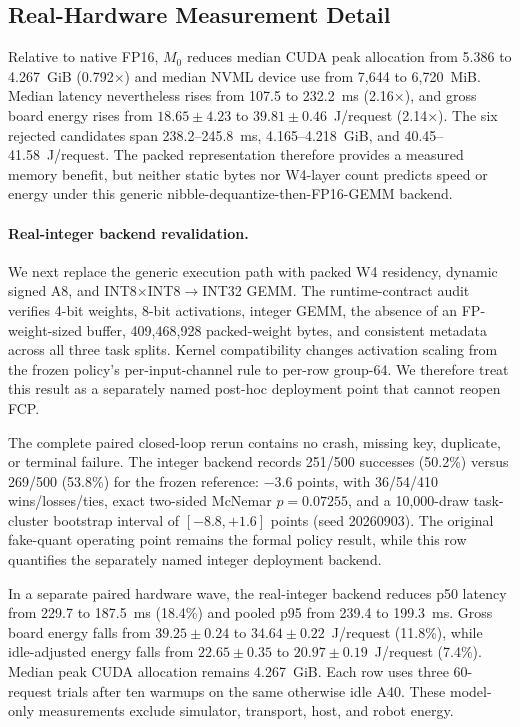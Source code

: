 \subsection{Real-Hardware Measurement Detail}
\label{sec:hardware_results}



Relative to native FP16, $M_0$ reduces median CUDA peak allocation from 5.386 to 4.267~GiB (0.792$\times$) and median NVML device use from 7,644 to 6,720~MiB. Median latency nevertheless rises from 107.5 to 232.2~ms (2.16$\times$), and gross board energy rises from $18.65\pm4.23$ to $39.81\pm0.46$~J/request (2.14$\times$). The six rejected candidates span 238.2--245.8~ms, 4.165--4.218~GiB, and 40.45--41.58~J/request. The packed representation therefore provides a measured memory benefit, but neither static bytes nor W4-layer count predicts speed or energy under this generic nibble-dequantize-then-FP16-GEMM backend.

\paragraph{Real-integer backend revalidation.}
We next replace the generic execution path with packed W4 residency, dynamic signed A8, and INT8$\times$INT8$\rightarrow$INT32 GEMM. The runtime-contract audit verifies 4-bit weights, 8-bit activations, integer GEMM, the absence of an FP-weight-sized buffer, 409,468,928 packed-weight bytes, and consistent metadata across all three task splits. Kernel compatibility changes activation scaling from the frozen policy's per-input-channel rule to per-row group-64. We therefore treat this result as a separately named post-hoc deployment point that cannot reopen FCP.

The complete paired closed-loop rerun contains no crash, missing key, duplicate, or terminal failure. The integer backend records 251/500 successes (50.2\%) versus 269/500 (53.8\%) for the frozen reference: $-3.6$ points, with 36/54/410 wins/losses/ties, exact two-sided McNemar $p=0.07255$, and a 10,000-draw task-cluster bootstrap interval of $[-8.8,+1.6]$ points (seed 20260903). The original fake-quant operating point remains the formal policy result, while this row quantifies the separately named integer deployment backend.

In a separate paired hardware wave, the real-integer backend reduces p50 latency from 229.7 to 187.5~ms (18.4\%) and pooled p95 from 239.4 to 199.3~ms. Gross board energy falls from $39.25\pm0.24$ to $34.64\pm0.22$~J/request (11.8\%), while idle-adjusted energy falls from $22.65\pm0.35$ to $20.97\pm0.19$~J/request (7.4\%). Median peak CUDA allocation remains 4.267~GiB. Each row uses three 60-request trials after ten warmups on the same otherwise idle A40. These model-only measurements exclude simulator, transport, host, and robot energy.

